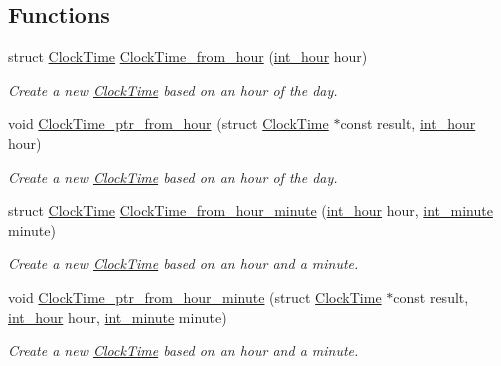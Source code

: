 \subsection*{Functions}
\begin{DoxyCompactItemize}
\item 
struct \hyperlink{structClockTime}{Clock\-Time} \hyperlink{clock-time_8h_ae5c4f2f2fc0532bb803b1701e2f1775c}{Clock\-Time\-\_\-from\-\_\-hour} (\hyperlink{types_8h_abc83767329d565949a30f9990b5b2323}{int\-\_\-hour} hour)
\begin{DoxyCompactList}\small\item\em Create a new \hyperlink{structClockTime}{Clock\-Time} based on an hour of the day. \end{DoxyCompactList}\item 
void \hyperlink{clock-time_8h_a1bf6417dca92b84860ae887aa913a4cb}{Clock\-Time\-\_\-ptr\-\_\-from\-\_\-hour} (struct \hyperlink{structClockTime}{Clock\-Time} $\ast$const result, \hyperlink{types_8h_abc83767329d565949a30f9990b5b2323}{int\-\_\-hour} hour)
\begin{DoxyCompactList}\small\item\em Create a new \hyperlink{structClockTime}{Clock\-Time} based on an hour of the day. \end{DoxyCompactList}\item 
struct \hyperlink{structClockTime}{Clock\-Time} \hyperlink{clock-time_8h_aa035b1f4af768453d8932ce43ba7ba35}{Clock\-Time\-\_\-from\-\_\-hour\-\_\-minute} (\hyperlink{types_8h_abc83767329d565949a30f9990b5b2323}{int\-\_\-hour} hour, \hyperlink{types_8h_ac1c9417e7360815b48bbc1efa2b8240c}{int\-\_\-minute} minute)
\begin{DoxyCompactList}\small\item\em Create a new \hyperlink{structClockTime}{Clock\-Time} based on an hour and a minute. \end{DoxyCompactList}\item 
void \hyperlink{clock-time_8h_a32d23ad7e3ef709bdeed070cb67230bc}{Clock\-Time\-\_\-ptr\-\_\-from\-\_\-hour\-\_\-minute} (struct \hyperlink{structClockTime}{Clock\-Time} $\ast$const result, \hyperlink{types_8h_abc83767329d565949a30f9990b5b2323}{int\-\_\-hour} hour, \hyperlink{types_8h_ac1c9417e7360815b48bbc1efa2b8240c}{int\-\_\-minute} minute)
\begin{DoxyCompactList}\small\item\em Create a new \hyperlink{structClockTime}{Clock\-Time} based on an hour and a minute. \end{DoxyCompactList}\item 

\end{DoxyCompactItemize}
